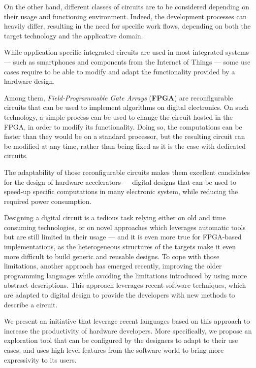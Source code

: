 On the other hand, different classes of circuits are to be considered depending on their usage and functioning environment.
Indeed, the development processes can heavily differ, resulting in the need for specific work flows, depending on both the target technology and the applicative domain.

\clearpage
While application specific integrated circuits are used in most integrated systems --- such as smartphones and components from the Internet of Things --- some use cases require to be able to modify and adapt the functionality provided by a hardware design.

Among them, {\it Field-Programmable Gate Arrays} ({\bf FPGA}) are reconfigurable circuits that can be used to implement algorithms on digital electronics.
On such technology, a simple process can be used to change the circuit hosted in the FPGA, in order to modify its functionality.
Doing so, the computations can be faster than they would be on a standard processor, but the resulting circuit can be modified at any time, rather than being fixed as it is the case with dedicated circuits. 

The adaptability of those reconfigurable circuits makes them excellent candidates for the design of hardware accelerators --- \ie{} digital designs that can be used to speed-up specific computations in many electronic system, while reducing the required power consumption.

Designing a digital circuit is a tedious task relying either on old and time consuming technologies, or on novel approaches which leverages automatic tools but are still limited in their usage --- and it is even more true for FPGA-based implementations, as the heterogeneous structures of the targets make it even more difficult to build generic and reusable designs.
To cope with those limitations, another approach has emerged recently, improving the older programming languages while avoiding the limitations introduced by using more abstract descriptions.
This approach leverages recent software techniques, which are adapted to digital design to provide the developers with new methods to describe a circuit.

We present an initiative that leverage recent languages based on this approach to increase the productivity of hardware developers.
More specifically, we propose an exploration tool that can be configured by the designers to adapt to their use cases, and uses high level features from the software world to bring more expressivity to its users.


